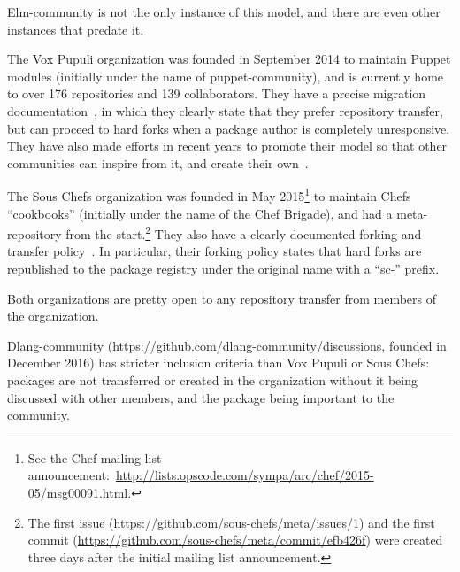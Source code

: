 Elm-community is not the only instance of this model, and there are even other instances that predate it.

The Vox Pupuli organization was founded in September 2014 to maintain Puppet modules (initially under the name of puppet-community), and is currently home to over 176 repositories and 139 collaborators.
They have a precise migration documentation~\cite{voxpupuli2016migrating}, in which they clearly state that they prefer repository transfer, but can proceed to hard forks when a package author is completely unresponsive.
They have also made efforts in recent years to promote their model so that other communities can inspire from it, and create their own~\cite{galic2017voxpupuli,hollinger2017voxpupuli}.

The Sous Chefs organization was founded in May 2015\footnote{
	See the Chef mailing list announcement: \url{http://lists.opscode.com/sympa/arc/chef/2015-05/msg00091.html}.
} to maintain Chefs ``cookbooks'' (initially under the name of the Chef Brigade), and had a meta-repository from the start.\footnote{
	The first issue (\url{https://github.com/sous-chefs/meta/issues/1}) and the first commit (\url{https://github.com/sous-chefs/meta/commit/efb426f}) were created three days after the initial mailing list announcement.
}
They also have a clearly documented forking and transfer policy~\cite{souschefs_fork,souschefs_transfer}.
In particular, their forking policy states that hard forks are republished to the package registry under the original name with a ``sc-'' prefix.

Both organizations are pretty open to any repository transfer from members of the organization.

Dlang-community (\url{https://github.com/dlang-community/discussions}, founded in December 2016) has stricter inclusion criteria than Vox Pupuli or Sous Chefs: packages are not transferred or created in the organization without it being discussed with other members, and the package being important to the community.

